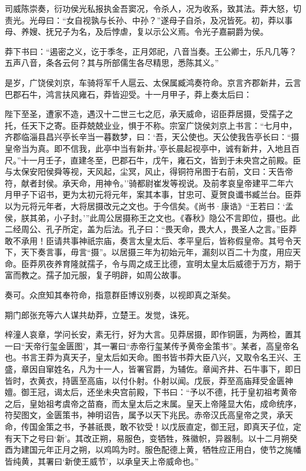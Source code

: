 \documentclass[]{article}
\begin{document}
司威陈崇奏，衍功侯光私报执金吾窦况，令杀人，况为收系，致其法。莽大怒，切责光。光母曰：``女自视孰与长孙、中孙？''遂母子自杀，及况皆死。初，莽以事母、养嫂、抚兄子为名，及后悖虐，复以示公义焉。令光子嘉嗣爵为侯。

莽下书曰：``遏密之义，讫于季冬，正月郊祀，八音当奏。王公卿士，乐凡几等？五声八音，条各云何？其与所部儒生各尽精思，悉陈其义。''

是岁，广饶侯刘京，车骑将军千人扈云、太保属臧鸿奏符命。京言齐郡新井，云言巴郡石牛，鸿言扶风雍石，莽皆迎受。十一月甲子，莽上奏太后曰：

陛下至圣，遭家不造，遇汉十二世三七之厄，承天威命，诏臣莽居摄，受孺子之托，任天下之寄。臣莽兢兢业业，惧于不称。宗室广饶侯刘京上书言：``七月中，齐郡临淄县昌兴亭长辛当一暮数梦，曰：`吾，天公使也。天公使我告亭长曰：``摄皇帝当为真。即不信我，此亭中当有新井。'亭长晨起视亭中，诚有新井，入地且百尺。''十一月壬子，直建冬至，巴郡石牛，戊午，雍石文，皆到于未央宫之前殿。臣与太保安阳侯舜等视，天风起，尘冥，风止，得铜符帛图于右前，文曰：天告帝符，献者封侯。承天命，用神令。''骑都尉崔发等视说。及前孝哀皇帝建平二年六月甲子下诏书，更为太初元将元年，案其本事，甘忠可、夏贺良谶书臧兰台。臣莽以为元将元年者，大将居摄改元之文也。于今信矣。《尚书·康诰》``王若曰：`孟侯，朕其弟，小子封。'''此周公居摄称王之文也。《春秋》隐公不言即位，摄也。此二经周公、孔子所定，盖为后法。孔子曰：``畏天命，畏大人，畏圣人之言。''臣莽敢不承用！臣请共事神祇宗庙，奏言太皇太后、孝平皇后，皆称假皇帝。其号令天下，天下奏言事，毋言``摄''。以居摄三年为初始元年，漏刻以百二十为度，用应天命。臣莽夙夜养育隆就孺子，令与周之成王比德，宣明太皇太后威德于万方，期于富而教之。孺子加元服，复子明辟，如周公故事。

奏可。众庶知其奉符命，指意群臣博议别奏，以视即真之渐矣。

期门郎张充等六人谋共劫莽，立楚王。发觉，诛死。

梓潼人哀章，学问长安，素无行，好为大言。见莽居摄，即作铜匮，为两检，置其一曰``天帝行玺金匮图'，其一署曰``赤帝行玺某传予黄帝金策书''。某者，高皇帝名也。书言王莽为真天子，皇太后如天命。图书皆书莽大臣八兴，又取令名王兴、王盛，章因自窜姓名，凡为十一人，皆署官爵，为辅佐。章闻齐井、石牛事下，即日皆时，衣黄衣，持匮至高庙，以付仆射。仆射以闻。戊辰，莽至高庙拜受金匮神嬗。御王冠，谒太后，还坐未央宫前殿，下书曰：``予以不德，托于皇初祖考黄帝之后，皇始祖考虞帝之苗裔，而太皇太后之末属。皇天上帝隆显大佑，成命统序，符契图文，金匮策书，神明诏告，属予以天下兆民。赤帝汉氏高皇帝之灵，承天命，传国金策之书，予甚祇畏，敢不钦受！以戊辰直定，御王冠，即真天子位，定有天下之号曰`新'。其改正朔，易服色，变牺牲，殊徽帜，异器制。以十二月朔癸酉为建国元年正月之朔，以鸡鸣为时。服色配德上黄，牺牲应正用白，使节之旄幡皆纯黄，其署曰`新使王威节'，以承皇天上帝威命也。''
\end{document}
